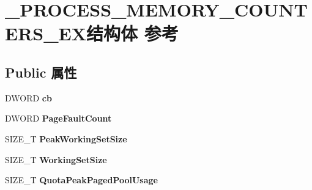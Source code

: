 \hypertarget{struct___p_r_o_c_e_s_s___m_e_m_o_r_y___c_o_u_n_t_e_r_s___e_x}{}\section{\+\_\+\+P\+R\+O\+C\+E\+S\+S\+\_\+\+M\+E\+M\+O\+R\+Y\+\_\+\+C\+O\+U\+N\+T\+E\+R\+S\+\_\+\+E\+X结构体 参考}
\label{struct___p_r_o_c_e_s_s___m_e_m_o_r_y___c_o_u_n_t_e_r_s___e_x}
\subsection*{Public 属性}
\begin{DoxyCompactItemize}
\item 
\mbox{\label{struct___p_r_o_c_e_s_s___m_e_m_o_r_y___c_o_u_n_t_e_r_s___e_x_a0b3756e6fac738b93a46cc69df309003}} 
D\+W\+O\+RD {\bfseries cb}
\item 
\mbox{\label{struct___p_r_o_c_e_s_s___m_e_m_o_r_y___c_o_u_n_t_e_r_s___e_x_afbe670747a9eccb9ba38cd1d3310b279}} 
D\+W\+O\+RD {\bfseries Page\+Fault\+Count}
\item 
\mbox{\label{struct___p_r_o_c_e_s_s___m_e_m_o_r_y___c_o_u_n_t_e_r_s___e_x_a65794c3811472bec739e2fe85ed01f93}} 
S\+I\+Z\+E\+\_\+T {\bfseries Peak\+Working\+Set\+Size}
\item 
\mbox{\label{struct___p_r_o_c_e_s_s___m_e_m_o_r_y___c_o_u_n_t_e_r_s___e_x_a8a7385e063ff7ce2c570a596aa596758}} 
S\+I\+Z\+E\+\_\+T {\bfseries Working\+Set\+Size}
\item 
\mbox{\label{struct___p_r_o_c_e_s_s___m_e_m_o_r_y___c_o_u_n_t_e_r_s___e_x_a42ca0d2a10741588a215c03d02b5d5b6}} 
S\+I\+Z\+E\+\_\+T {\bfseries Quota\+Peak\+Paged\+Pool\+Usage}
\item 
\mbox{\label{struct___p_r_o_c_e_s_s___m_e_m_o_r_y___c_o_u_n_t_e_r_s___e_x_a4f5d6c80bc20ab5c3bda1f277194141b}} 

\end{DoxyCompactItemize}

